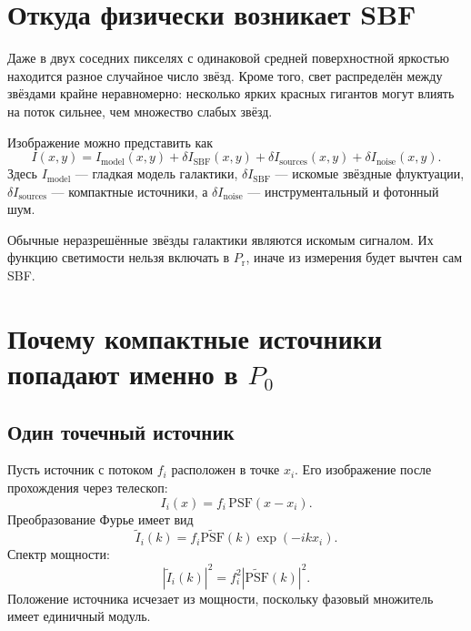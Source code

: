 \documentclass[12pt,a4paper]{article}
\newcommand{\Prpow}{P_{\mathrm r}}
\begin{document}
\section{Откуда физически возникает SBF}

Даже в двух соседних пикселях с одинаковой средней
поверхностной яркостью находится разное случайное число
звёзд. Кроме того, свет распределён между звёздами крайне
неравномерно: несколько ярких красных гигантов могут влиять
на поток сильнее, чем множество слабых звёзд.

Изображение можно представить как
\begin{equation}
    I(x,y) =
    I_{\mathrm{model}}(x,y)
    + \delta I_{\mathrm{SBF}}(x,y)
    + \delta I_{\mathrm{sources}}(x,y)
    + \delta I_{\mathrm{noise}}(x,y).
\end{equation}
Здесь \(I_{\mathrm{model}}\) --- гладкая модель галактики,
\(\delta I_{\mathrm{SBF}}\) --- искомые звёздные флуктуации,
\(\delta I_{\mathrm{sources}}\) --- компактные источники, а
\(\delta I_{\mathrm{noise}}\) --- инструментальный и фотонный
шум.

Обычные неразрешённые звёзды галактики являются искомым
сигналом. Их функцию светимости нельзя включать в
\(\Prpow\), иначе из измерения будет вычтен сам SBF.

\section{Почему компактные источники попадают именно в \(P_0\)}

\subsection{Один точечный источник}

Пусть источник с потоком \(f_i\) расположен в точке \(x_i\).
Его изображение после прохождения через телескоп:
\begin{equation}
    I_i(x) = f_i\,\mathrm{PSF}(x-x_i).
\end{equation}
Преобразование Фурье имеет вид
\begin{equation}
    \widetilde I_i(k) =
    f_i\widetilde{\mathrm{PSF}}(k)
    \exp(-ikx_i).
\end{equation}
Спектр мощности:
\begin{equation}
    \left|\widetilde I_i(k)\right|^2 =
    f_i^2
    \left|\widetilde{\mathrm{PSF}}(k)\right|^2.
\end{equation}
Положение источника исчезает из мощности, поскольку фазовый
множитель имеет единичный модуль.
\end{document}
